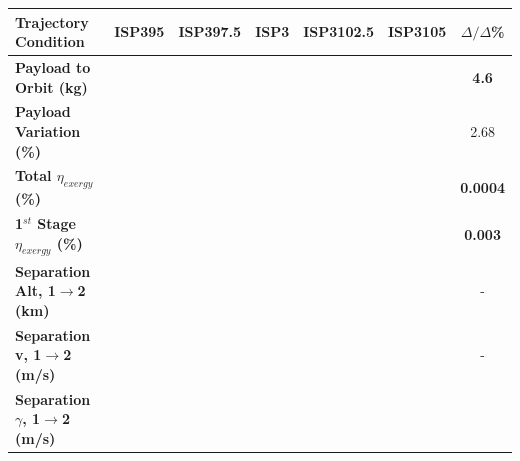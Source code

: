 \begin{table}[ht]
	\centering
	\begin{tabular}{l c c c c c c} 
		\hline \textbf{Trajectory Condition}
		&ISP395
		&ISP397.5
		&ISP3
		&ISP3102.5
		&ISP3105
		& $\Delta/\Delta$\%
		\\
		\hline \textbf{Payload to Orbit (kg)}
		& \textbf{\PayloadToOrbitISPThreeNinety}
		& \textbf{\PayloadToOrbitISPThreeNinetyFive}
		& \textbf{\PayloadToOrbitISPThreeStandard}
		& \textbf{\PayloadToOrbitISPThreeOneHundredFive}
		& \textbf{\PayloadToOrbitISPThreeOneHundredTen}
		&\textbf{4.6}
		\\
		\textbf{Payload Variation (\%)}
		& \PayloadVarISPThreeNinety
		& \PayloadVarISPThreeNinetyFive
		& \PayloadVarISPThreeStandard
		& \PayloadVarISPThreeOneHundredFive
		& \PayloadVarISPThreeOneHundredTen
		&2.68
		\\
		\textbf{Total $\eta_{exergy}$ (\%)}
		& \textbf{\totalExergyEffISPThreeNinety}
		& \textbf{\totalExergyEffISPThreeNinetyFive}
		& \textbf{\totalExergyEffISPThreeStandard}
		& \textbf{\totalExergyEffISPThreeOneHundredFive}
		& \textbf{\totalExergyEffISPThreeOneHundredTen}
		& \textbf{0.0004}
		\\
		\hline 
		\textbf{1$^{st}$ Stage $\eta_{exergy}$ (\%)}
		& \textbf{\firstExergyEffISPThreeNinety}
		& \textbf{\firstExergyEffISPThreeNinetyFive}
		& \textbf{\firstExergyEffISPThreeStandard}
		& \textbf{\firstExergyEffISPThreeOneHundredFive}
		& \textbf{\firstExergyEffISPThreeOneHundredTen}
		& \textbf{0.003}
		\\
		\textbf{Separation Alt, 1$\rightarrow$2 (km)}
		& \firstsecondSeparationAltISPThreeNinety
		& \firstsecondSeparationAltISPThreeNinetyFive
		& \firstsecondSeparationAltISPThreeStandard
		& \firstsecondSeparationAltISPThreeOneHundredFive
		& \firstsecondSeparationAltISPThreeOneHundredTen
		& -
		\\
		\textbf{Separation v, 1$\rightarrow$2 (m/s)}
		& \firstsecondSeparationvISPThreeNinety
		& \firstsecondSeparationvISPThreeNinetyFive
		& \firstsecondSeparationvISPThreeStandard
		& \firstsecondSeparationvISPThreeOneHundredFive
		& \firstsecondSeparationvISPThreeOneHundredTen
		& -
		\\
		\textbf{Separation $\gamma$, 1$\rightarrow$2 (m/s)}
		& \firstsecondSeparationgammaISPThreeNinety
		& \firstsecondSeparationgammaISPThreeNinetyFive
		& \firstsecondSeparationgammaISPThreeStandard
		& \firstsecondSeparationgammaISPThreeOneHundredFive
		& \firstsecondSeparationgammaISPThreeOneHundredTen

\end{tabular}
\end{table}
